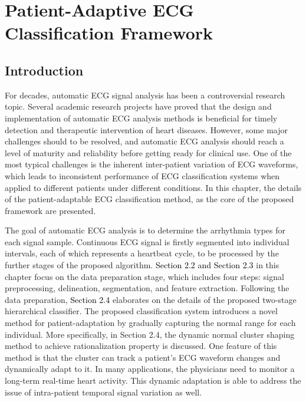 \chapter{Patient-Adaptive ECG Classification Framework}

\section{Introduction}
For decades, automatic ECG signal analysis has been a controversial research topic. Several academic research projects have proved that the design and implementation of automatic ECG analysis methods is beneficial for timely detection and therapeutic intervention of heart diseases. However, some major challenges should to be resolved, and automatic ECG analysis should reach a level of maturity and reliability before getting ready for clinical use. One of the most typical challenges is the inherent inter-patient variation of ECG waveforms, which leads to inconsistent performance of ECG classification systems when applied to different patients under different conditions. In this chapter, the details of the patient-adaptable ECG classification method, as the core of the proposed framework are presented.

The goal of automatic ECG analysis is to determine the arrhythmia types for each signal sample. Continuous ECG signal is firstly segmented into individual intervals, each of which represents a heartbeat cycle, to be processed by the further stages of the proposed algorithm. \textcolor{black}{Section 2.2 and Section 2.3} in this chapter focus on the data preparation stage, which includes four steps: signal preprocessing, delineation, segmentation, and feature extraction. Following the data preparation, \textcolor{black}{Section 2.4} elaborates on the details of the proposed two-stage hierarchical classifier. The proposed classification system introduces a novel method for patient-adaptation by gradually capturing the normal range for each individual. More specifically, in Section 2.4, the dynamic normal cluster shaping method to achieve rationalization property is discussed. One feature of this method is that the cluster can track a patient's ECG waveform changes and dynamically adapt to it. In many applications, the physicians need to monitor a long-term real-time heart activity. This dynamic adaptation is able to address the issue of intra-patient temporal signal variation as well.


